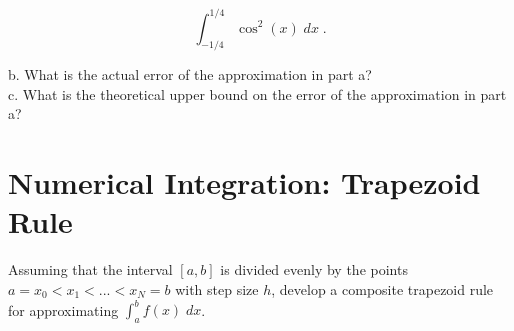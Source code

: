 \documentclass[a4paper]{article}
\begin{document}
$$\int_{-1/4}^{1/4} \cos^2(x) \; dx \;.$$

b. What is the actual error of the approximation in part a?\\

c. What is the theoretical upper bound on the error of the approximation in part a?

\newpage

\section*{Numerical Integration: Trapezoid Rule}

Assuming that the interval $[a,b]$ is divided evenly by the points $a = x_0 < x_1 < ... < x_N = b$ with step size $h$, develop a composite trapezoid rule for approximating $\int_a^b f(x) \; dx$. 
\end{document}
